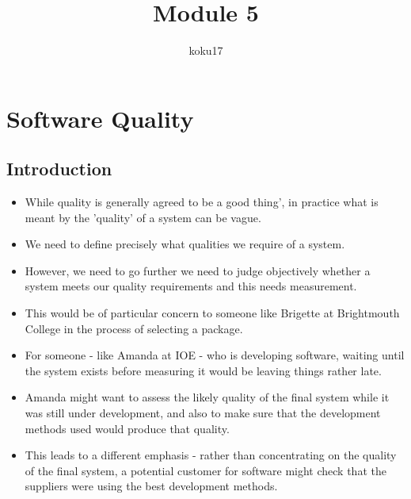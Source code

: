 \documentclass{article}
\author{koku17}
\title{Module 5}
\begin{document}
	     \maketitle       \newpage
	     \tableofcontents \newpage
	 \listoffigures   \newpage
	   \listoftables    \newpage

	\section{Software Quality}
	\subsection{Introduction}
	\begin{itemize}
		\item While quality is generally agreed to be a good thing', in practice what is meant by the 'quality'
			of a system can be vague.
		\item We need to define precisely what qualities we require of a system.
		\item However, we need to go further we need to judge objectively whether a system meets our quality
			requirements and this needs measurement.
		\item This would be of particular concern to someone like Brigette at Brightmouth College in the process
			of selecting a package.
		\item For someone - like Amanda at IOE - who is developing software, waiting until the system exists
			before measuring it would be leaving things rather late.
		\item Amanda might want to assess the likely quality of the final system while it was still under
			development, and also to make sure that the development methods used would produce that quality.
		\item This leads to a different emphasis - rather than concentrating on the quality of the final system,
			a potential customer for software might check that the suppliers were using the best development
			methods.
	\end{itemize}
\end{document}
